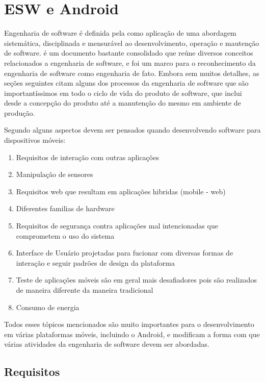 \chapter{ESW e Android}
\label{cap:eswandroid}

Engenharia de software é definida pela  como aplicação de uma abordagem sistemática, disciplinada e mensurável ao desenvolvimento, operação e mautenção de software.  é um documento bastante consolidado que reúne diversos conceitos relacionados a engenharia de software, e foi um marco para o reconhecimento da engenharia de software como engenharia de fato. Embora sem muitos detalhes, as seções seguintes citam alguns dos processos da engenharia de software que são importantíssimos em todo o ciclo de vida do produto de software, que inclui desde a concepção do produto até a manutenção do mesmo em ambiente de produção.

Segundo  alguns aspectos devem ser pensados quando desenvolvendo software para dispositivos móveis:

\begin{enumerate}
\item Requisitos de interação com outras aplicações
\item Manipulação de sensores
\item Requisitos web que resultam em aplicações hibridas (mobile - web)
\item Diferentes familias de hardware
\item Requisitos de segurança contra aplicações mal intencionadas que comprometem o uso do sistema
\item Interface de Usuário projetadas para fucionar com diversas formas de interação e seguir padrões de design da plataforma
\item Teste de aplicações móveis são em geral mais desafiadores pois são realizados de maneira diferente da maneira tradicional
\item Consumo de energia
\end{enumerate}

Todos esses tópicos mencionados são muito importantes para o desenvolvimento em várias plataformas móveis, incluindo o Android, e modificam a forma com que várias atividades da engenharia de software devem ser abordadas.


\section{Requisitos}

